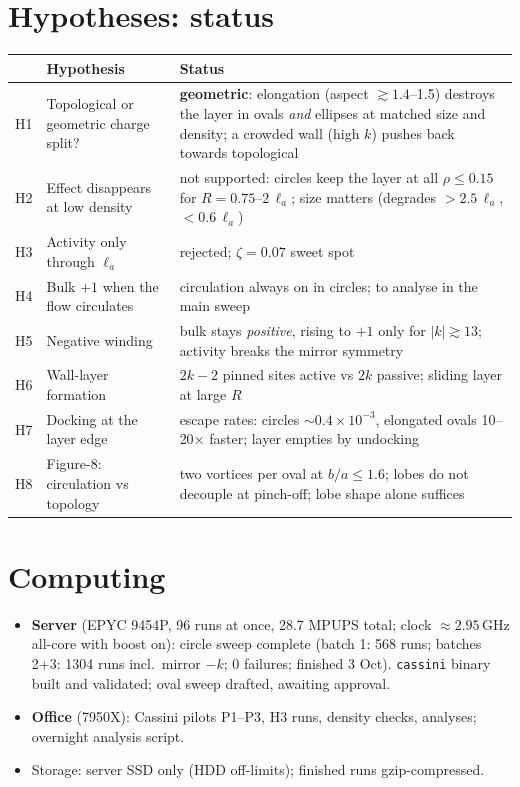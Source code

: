 \documentclass[11pt,a4paper]{article}
\newcommand{\la}{\ell_a}
\begin{document}






\section{Hypotheses: status}
{\small\renewcommand{\arraystretch}{1.25}
\begin{tabularx}{\textwidth}{@{}l>{\raggedright\arraybackslash}p{}>{\raggedright\arraybackslash}X@{}}\toprule
& Hypothesis & Status\\\midrule
H1 & Topological or geometric charge split? & \textbf{geometric}: elongation (aspect $\gtrsim1.4$--1.5) destroys the layer in ovals \emph{and} ellipses at matched size and density; a crowded wall (high $k$) pushes back towards topological\\
H2 & Effect disappears at low density & not supported: circles keep the layer at all $\rho\le0.15$ for $R=0.75$--$2\,\la$; size matters (degrades $>2.5\,\la$, $<0.6\,\la$)\\
H3 & Activity only through $\la$ & rejected; $\zeta=0.07$ sweet spot\\
H4 & Bulk $+1$ when the flow circulates & circulation always on in circles; to analyse in the main sweep\\
H5 & Negative winding & bulk stays \emph{positive}, rising to $+1$ only for $|k|\gtrsim13$; activity breaks the mirror symmetry\\
H6 & Wall-layer formation & $2k-2$ pinned sites active vs $2k$ passive; sliding layer at large $R$\\
H7 & Docking at the layer edge & escape rates: circles $\sim0.4\times10^{-3}$, elongated ovals 10--20$\times$ faster; layer empties by undocking\\
H8 & Figure-8: circulation vs topology & two vortices per oval at $b/a\le1.6$; lobes do not decouple at pinch-off; lobe shape alone suffices\\\bottomrule
\end{tabularx}}

\section{Computing}
\begin{itemize}
  \item \textbf{Server} (EPYC 9454P, 96 runs at once, 28.7 MPUPS total; clock $\approx2.95$\,GHz all-core with boost on):
        circle sweep complete (batch 1: 568 runs; batches 2+3: 1304 runs incl.\ mirror $-k$; 0 failures; finished 3 Oct).
        \texttt{cassini} binary built and validated; oval sweep drafted, awaiting approval.
  \item \textbf{Office} (7950X): Cassini pilots P1--P3, H3 runs, density checks, analyses; overnight analysis script.
  \item Storage: server SSD only (HDD off-limits); finished runs gzip-compressed.
\end{itemize}
\end{document}
